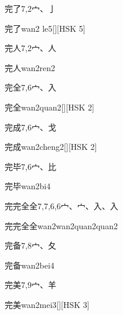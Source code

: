 \begin{entry}{完了}{7,2}{⼧、⼅}
  \begin{phonetics}{完了}{wan2 le5}[][HSK 5]
  \end{phonetics}
\end{entry}

\begin{entry}{完人}{7,2}{⼧、⼈}
  \begin{phonetics}{完人}{wan2ren2}
  \end{phonetics}
\end{entry}

\begin{entry}{完全}{7,6}{⼧、⼊}
  \begin{phonetics}{完全}{wan2quan2}[][HSK 2]
  \end{phonetics}
\end{entry}

\begin{entry}{完成}{7,6}{⼧、⼽}
  \begin{phonetics}{完成}{wan2cheng2}[][HSK 2]
  \end{phonetics}
\end{entry}

\begin{entry}{完毕}{7,6}{⼧、⽐}
  \begin{phonetics}{完毕}{wan2bi4}
  \end{phonetics}
\end{entry}

\begin{entry}{完完全全}{7,7,6,6}{⼧、⼧、⼊、⼊}
  \begin{phonetics}{完完全全}{wan2wan2quan2quan2}
  \end{phonetics}
\end{entry}

\begin{entry}{完备}{7,8}{⼧、⼡}
  \begin{phonetics}{完备}{wan2bei4}
  \end{phonetics}
\end{entry}

\begin{entry}{完美}{7,9}{⼧、⽺}
  \begin{phonetics}{完美}{wan2mei3}[][HSK 3]
  \end{phonetics}
\end{entry}

